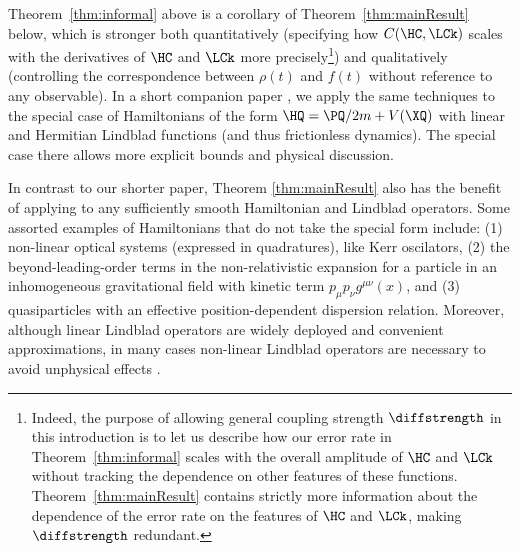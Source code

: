 \documentclass{article}
\numberwithin{equation}{section}
\begin{document}
Theorem~\ref{thm:informal} above is a corollary of Theorem~\ref{thm:mainResult} below, which is stronger both quantitatively (specifying how $C(\HC,\LCk)$ scales with the derivatives of $\HC$ and $\LCk$ more precisely\footnote{Indeed, the purpose of allowing general coupling strength $\diffstrength$ in this introduction is to let us describe how our error rate in Theorem~\ref{thm:informal} scales with the overall amplitude of $\HC$ and $\LCk$ without tracking the dependence on other features of these functions. Theorem~\ref{thm:mainResult} contains strictly more information about the dependence of the error rate on the features of $\HC$ and $\LCk$, making $\diffstrength$ redundant.}) and qualitatively (controlling the correspondence between $\rho(t)$ and $f(t)$ without reference to any observable).
In a short companion paper \cite{hernandez2023decoherence1}, we apply the same techniques to the special case of Hamiltonians of the form $\HQ = \PQ/2m+V(\XQ)$ with linear and Hermitian Lindblad functions (and thus frictionless dynamics).
The special case there allows more explicit bounds and physical discussion.

In contrast to our shorter paper, Theorem \ref{thm:mainResult} also has the benefit of applying to any sufficiently smooth Hamiltonian and Lindblad operators. 
Some assorted examples of Hamiltonians that do not take the special form include: (1) non-linear optical systems (expressed in quadratures), like Kerr oscilators, (2) the beyond-leading-order terms in the non-relativistic expansion for a particle in an inhomogeneous gravitational field with kinetic term $p_\mu p_\nu g^{\mu\nu}(x)$, and (3) quasiparticles with an effective position-dependent dispersion relation.  Moreover, although linear Lindblad operators are widely deployed and convenient approximations, in many cases non-linear Lindblad operators are necessary to avoid unphysical effects \cite{gallis1990environmental}.
\end{document}
